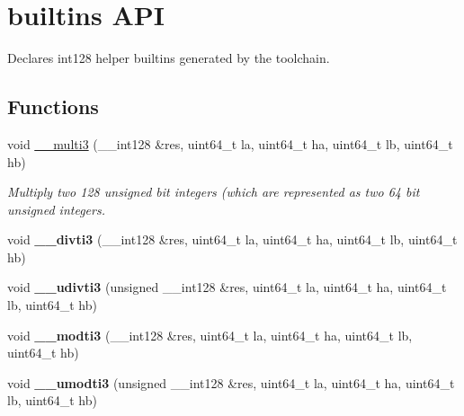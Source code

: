 \hypertarget{group__compiler}{}\section{builtins A\+PI}
\label{group__compiler}


Declares int128 helper builtins generated by the toolchain.  


\subsection*{Functions}
\begin{DoxyCompactItemize}
\item 
void \mbox{\hyperlink{group__compiler_gaa03897335f1fcc54f469e17c32ae9920}{\+\_\+\+\_\+multi3}} (\+\_\+\+\_\+int128 \&res, uint64\+\_\+t la, uint64\+\_\+t ha, uint64\+\_\+t lb, uint64\+\_\+t hb)
\begin{DoxyCompactList}\small\item\em Multiply two 128 unsigned bit integers (which are represented as two 64 bit unsigned integers. \end{DoxyCompactList}\item 
\mbox{\label{group__compiler_gadbd9c6953240b4ca52292ea687d64839}} 
void {\bfseries \+\_\+\+\_\+divti3} (\+\_\+\+\_\+int128 \&res, uint64\+\_\+t la, uint64\+\_\+t ha, uint64\+\_\+t lb, uint64\+\_\+t hb)
\item 
\mbox{\label{group__compiler_gaed86fd6c88a54c19700f51a3f36890d3}} 
void {\bfseries \+\_\+\+\_\+udivti3} (unsigned \+\_\+\+\_\+int128 \&res, uint64\+\_\+t la, uint64\+\_\+t ha, uint64\+\_\+t lb, uint64\+\_\+t hb)
\item 
\mbox{\label{group__compiler_gacf950a5162ebd45ceec1463d352a42dd}} 
void {\bfseries \+\_\+\+\_\+modti3} (\+\_\+\+\_\+int128 \&res, uint64\+\_\+t la, uint64\+\_\+t ha, uint64\+\_\+t lb, uint64\+\_\+t hb)
\item 
\mbox{\label{group__compiler_ga25eb2263db624647faf0c395b32f2bdb}} 
void {\bfseries \+\_\+\+\_\+umodti3} (unsigned \+\_\+\+\_\+int128 \&res, uint64\+\_\+t la, uint64\+\_\+t ha, uint64\+\_\+t lb, uint64\+\_\+t hb)
\item 
\mbox{\label{group__compiler_ga19640af2c08e820f5aa09069b1827c9b}} 

\end{DoxyCompactItemize}
